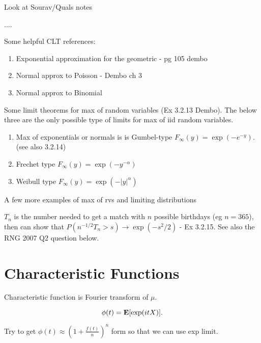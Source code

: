\documentclass{article}
\begin{document}
\begin{theorem}
Look at Sourav/Quals notes
\end{theorem}
\begin{theorem}
....
\end{theorem}

Some helpful CLT references:
\begin{enumerate}
	\item Exponential approximation for the geometric - pg 105 dembo
	\item Normal approx to Poisson - Dembo ch 3
	\item Normal approx to Binomial
\end{enumerate}

Some limit theorems for max of random variables (Ex 3.2.13 Dembo). The below three are the only possible type of limits for max of iid random variables. 
\begin{enumerate}
	\item Max of exponentials or normals is is Gumbel-type $F_\infty(y) = \exp(-e^{-y})$. (see also 3.2.14)
	\item Frechet type $F_\infty(y) = \exp(-y^{-\alpha})$
	\item Weibull type $F_\infty(y) = \exp(-|y|^\alpha)$
\end{enumerate}
A few more examples of max of rvs and limiting distributions

\begin{example}
$T_n$ is the number needed to get a match with $n$ possible birthdays (eg $n=365$), then can show that $P(n^{-1/2} T_n >s) \to \exp(-s^2/2)$ - Ex 3.2.15. See also the RNG 2007 Q2 question below. 
\end{example}



\section{Characteristic Functions}
\begin{definition}
Characteristic function is Fourier transform of $\mu$. 

$$\phi(t) = \mathbf{E} [\exp(itX)].$$


\begin{recipe}
Try to get $\phi(t) \approx (1+ \frac{f(t)}{n})^n$ form so that we can use exp limit. 
\end{recipe}
\end{definition}
\end{document}
